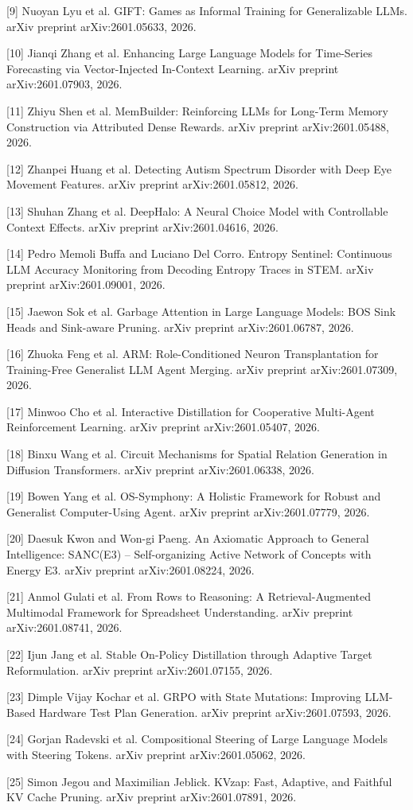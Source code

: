 \documentclass{article}
\begin{document}
[9] Nuoyan Lyu et al. GIFT: Games as Informal Training for Generalizable LLMs. arXiv preprint arXiv:2601.05633, 2026.

[10] Jianqi Zhang et al. Enhancing Large Language Models for Time-Series Forecasting via Vector-Injected In-Context Learning. arXiv preprint arXiv:2601.07903, 2026.

[11] Zhiyu Shen et al. MemBuilder: Reinforcing LLMs for Long-Term Memory Construction via Attributed Dense Rewards. arXiv preprint arXiv:2601.05488, 2026.

[12] Zhanpei Huang et al. Detecting Autism Spectrum Disorder with Deep Eye Movement Features. arXiv preprint arXiv:2601.05812, 2026.

[13] Shuhan Zhang et al. DeepHalo: A Neural Choice Model with Controllable Context Effects. arXiv preprint arXiv:2601.04616, 2026.

[14] Pedro Memoli Buffa and Luciano Del Corro. Entropy Sentinel: Continuous LLM Accuracy Monitoring from Decoding Entropy Traces in STEM. arXiv preprint arXiv:2601.09001, 2026.

[15] Jaewon Sok et al. Garbage Attention in Large Language Models: BOS Sink Heads and Sink-aware Pruning. arXiv preprint arXiv:2601.06787, 2026.

[16] Zhuoka Feng et al. ARM: Role-Conditioned Neuron Transplantation for Training-Free Generalist LLM Agent Merging. arXiv preprint arXiv:2601.07309, 2026.

[17] Minwoo Cho et al. Interactive Distillation for Cooperative Multi-Agent Reinforcement Learning. arXiv preprint arXiv:2601.05407, 2026.

[18] Binxu Wang et al. Circuit Mechanisms for Spatial Relation Generation in Diffusion Transformers. arXiv preprint arXiv:2601.06338, 2026.

[19] Bowen Yang et al. OS-Symphony: A Holistic Framework for Robust and Generalist Computer-Using Agent. arXiv preprint arXiv:2601.07779, 2026.

[20] Daesuk Kwon and Won-gi Paeng. An Axiomatic Approach to General Intelligence: SANC(E3) -- Self-organizing Active Network of Concepts with Energy E3. arXiv preprint arXiv:2601.08224, 2026.

[21] Anmol Gulati et al. From Rows to Reasoning: A Retrieval-Augmented Multimodal Framework for Spreadsheet Understanding. arXiv preprint arXiv:2601.08741, 2026.

[22] Ijun Jang et al. Stable On-Policy Distillation through Adaptive Target Reformulation. arXiv preprint arXiv:2601.07155, 2026.

[23] Dimple Vijay Kochar et al. GRPO with State Mutations: Improving LLM-Based Hardware Test Plan Generation. arXiv preprint arXiv:2601.07593, 2026.

[24] Gorjan Radevski et al. Compositional Steering of Large Language Models with Steering Tokens. arXiv preprint arXiv:2601.05062, 2026.

[25] Simon Jegou and Maximilian Jeblick. KVzap: Fast, Adaptive, and Faithful KV Cache Pruning. arXiv preprint arXiv:2601.07891, 2026.
\end{document}
